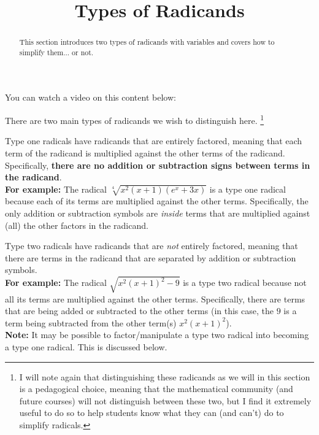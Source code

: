\documentclass{ximera}
\title{Types of Radicands}
\begin{document}
\begin{abstract}
    This section introduces two types of radicands with variables and covers how to simplify them... or not.
\end{abstract}
\maketitle

You can watch a video on this content below:


There are two main types of radicands we wish to distinguish here.%
\footnote{%
    I will note again that distinguishing these radicands as we will in this section is a pedagogical choice, meaning that the mathematical community (and future courses) will not distinguish between these two, but I find it extremely useful to do so to help students know what they can (and can't) do to simplify radicals.%
    }

\begin{definition} 
    Type one radicals have radicands that are entirely factored, meaning that each term of the radicand is multiplied against the other terms of the radicand. Specifically, \textbf{there are no addition or subtraction signs between terms in the radicand}.\\
    \textbf{For example:} The radical $\sqrt[4]{x^2(x+1)(e^x + 3x)}$ is a type one radical because each of its terms are multiplied against the other terms. Specifically, the only addition or subtraction symbols are \textit{inside} terms that are multiplied against (all) the other factors in the radicand.
\end{definition}
\begin{definition} 
    Type two radicals have radicands that are \textit{not} entirely factored, meaning that there are terms in the radicand that are separated by addition or subtraction symbols.\\
    \textbf{For example:} The radical $\sqrt{x^2(x+1)^2 - 9}$ is a type two radical because not all its terms are multiplied against the other terms. Specifically, there are terms that are being added or subtracted to the other terms (in this case, the $9$ is a term being subtracted from the other term(s) $x^2(x+1)^2$).\\
    \textbf{Note:} It may be possible to factor/manipulate a type two radical into becoming a type one radical. This is discussed below.
\end{definition}
\end{document}
